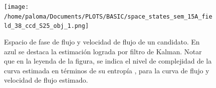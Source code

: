 \begin{figure}[h!]
\centering

\texttt{[image: /home/paloma/Documents/PLOTS/BASIC/space\_states\_sem\_15A\_field\_38\_ccd\_S25\_obj\_1.png]}
\caption{Espacio de fase de flujo y velocidad de flujo de un candidato. En azul se destaca la estimaci\'on lograda por filtro de Kalman. Notar que en la leyenda de la figura, se indica el nivel de complejidad de la curva estimada en t\'erminos de su entrop\'ia \cite{balestrino}, para la curva de flujo y velocidad de flujo estimado.}
\label{fig:sp_st}
\end{figure}

